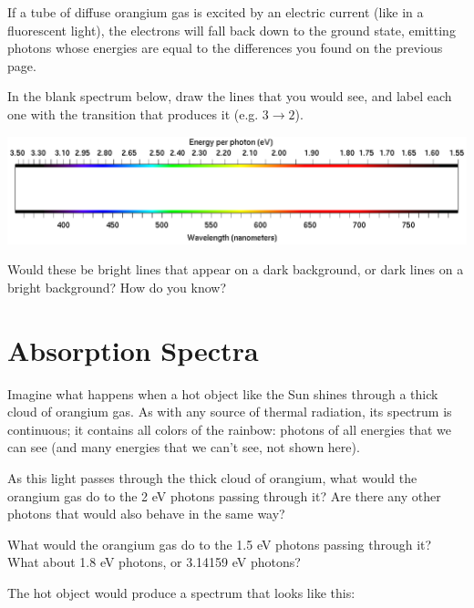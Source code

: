 \documentclass[12pt]{article}
\newcommand{\BC}{\begin{center}}
\newcommand{\EC}{\end{center}}
\begin{document}
\newpage


If a tube of diffuse orangium gas is excited by an electric current (like in a fluorescent light), the electrons will fall back down to the ground state, emitting photons whose energies are equal to the differences you found on the previous page. 

In the blank spectrum below, draw the lines that you would see, and label each one with the transition that produces it (e.g. $3 \rightarrow 2$).

\BC
\includegraphics[width=7in]{spectrum-blank.png}
\EC

Would these be bright lines that appear on a dark background, or dark lines on a bright background? How do you know?

\vspace{1.2in}

\section{Absorption Spectra}

Imagine what happens when a hot object like the Sun shines through a thick cloud of orangium gas. As with any source of thermal radiation, its spectrum is continuous; it contains all colors of the rainbow: photons of all energies that we can see (and many energies that we can't see, not shown here).

As this light passes through the thick cloud of orangium, what would the orangium gas do to the 2 eV photons passing through it? Are there any other photons that would also behave in the same way?

\vspace{1in}

What would the orangium gas do to the 1.5 eV photons passing through it? What about 1.8 eV photons, or 3.14159 eV photons?

\vspace{0.5in}

\newpage


 The hot object would produce a spectrum that looks like this:
\end{document}
